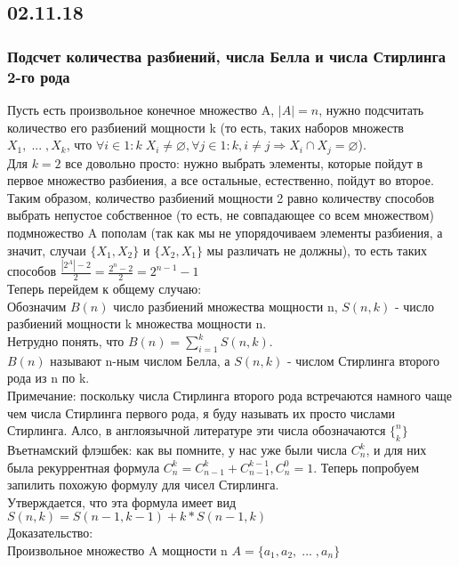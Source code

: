 \subsection{02.11.18}
\subsubsection{Подсчет количества разбиений, числа Белла и числа Стирлинга 2-го рода}
Пусть есть произвольное конечное множество A, $|A| = n$, нужно подсчитать количество его разбиений мощности k (то есть, таких наборов множеств $X_1, \; ... \; , X_k$, что $\forall i \in 1:k \; X_i \not= \varnothing, \forall j \in 1:k, i \not= j \Rightarrow X_i \cap X_j = \varnothing$).\\
Для $k = 2$ все довольно просто: нужно выбрать элементы, которые пойдут в первое множество разбиения, а все остальные, естественно, пойдут во второе. Таким образом, количество разбиений мощности 2 равно количеству способов выбрать непустое собственное (то есть, не совпадающее со всем множеством) подмножество A пополам (так как мы не упорядочиваем элементы разбиения, а значит, случаи $\{X_1, X_2\}$ и $\{X_2, X_1\}$ мы различать не должны), то есть таких способов $\frac{|2^A| - 2}{2} = \frac{2^n - 2}{2} = 2^{n - 1} - 1$\\
Теперь перейдем к общему случаю:\\
Обозначим $B(n)$ число разбиений множества мощности n, $S(n, k)$ - число разбиений мощности k множества мощности n.\\
Нетрудно понять, что $B(n) = \sum\limits_{i = 1}^{k}S(n, k)$.\\
$B(n)$ называют n-ным числом Белла, а $S(n, k)$ - числом Стирлинга второго рода из n по k. \\
Примечание: поскольку числа Стирлинга второго рода встречаются намного чаще чем числа Стирлинга первого рода, я буду называть их просто числами Стирлинга. Алсо, в англоязычной литературе эти числа обозначаются $\{^n_k\}$\\
Въетнамский флэшбек: как вы помните, у нас уже были числа $C^k_n$, и для них была рекуррентная формула $C^k_n = C^k_{n - 1} + C^{k - 1}_{n - 1}, C^0_n = 1$. Теперь попробуем запилить похожую формулу для чисел Стирлинга.\\
Утверждается, что эта формула имеет вид $S(n, k) = S(n - 1, k - 1) + k * S(n - 1, k)$\\
Доказательство:\\
Произвольное множество A мощности n $A = \{a_1, a_2, \; ... \; , a_n\}$\\
